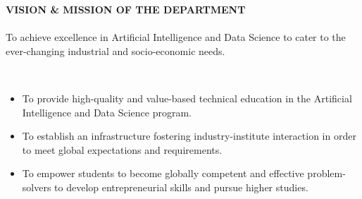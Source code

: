 {}
\fancyhead{}
\fancyfoot{}


\renewcommand{\footrulewidth}{0pt}
\renewcommand{\headrulewidth}{0pt}
\newcommand{\wideunderline}[2][2em]{%
  \underline{\makebox[\ifdim\width>#1\width\else#1\fi]{#2}}%
}
\begin{center}
 \vspace*{1cm}
    \Large \textbf{ VISION \& MISSION OF THE DEPARTMENT}
     \vspace*{2.0cm}
\\ {\Large \bf \wideunderline[12em]{Vision}}
 \\ \vspace{1.0cm}
 {\normalsize To achieve excellence in Artificial Intelligence and Data Science to cater 
 to the ever-changing industrial and socio-economic needs.} 

 \vspace*{2.0cm}

 {\Large \bf \wideunderline[12em]{Mission}}
 \\ \vspace{1.0cm}
 \begin{itemize}
   \item \normalsize To provide high-quality and value-based technical education in the Artificial Intelligence and Data Science program.
   \item \normalsize To establish an infrastructure fostering industry-institute interaction in order to meet global expectations and requirements.
   \item \normalsize To empower students to become globally competent and effective problem-solvers to develop entrepreneurial skills and pursue higher studies.
 \end{itemize}

\end{center}
